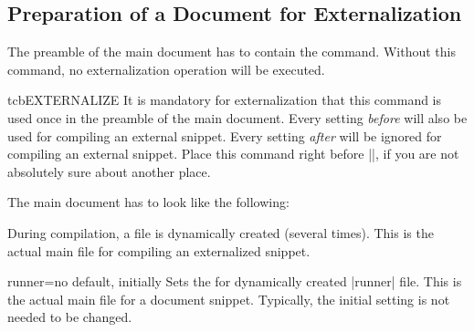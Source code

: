 
% 




\subsection{Preparation of a Document for Externalization}\label{subsec:external_preparation}

The preamble of the main document has to contain the 
command. Without this command, no externalization operation will be
executed.

\begin{docCommand}[doc new=2015-03-11]{tcbEXTERNALIZE}{}
  It is mandatory for externalization that this command is used once
  in the preamble of the main document. Every setting \emph{before}
   will also be used for compiling an external
  snippet. Every setting \emph{after}  will be
  ignored for compiling an external snippet.
  Place this command right before ||, if you are not
  absolutely sure about another place.

  The main document has to look like the following:

\end{docCommand}

During compilation, a  file
is dynamically created (several times). This is the actual main file for
compiling an externalized snippet.

\begin{extTcbKey}[][doc new=2015-03-11]{runner}{=}{no default,
  initially \texttt{}}
Sets the  for dynamically created |runner| file.
This is the actual main file for a document snippet.
Typically, the initial setting is not needed to be changed.
\begin{dispListing}
\end{dispListing}
\end{extTcbKey}

